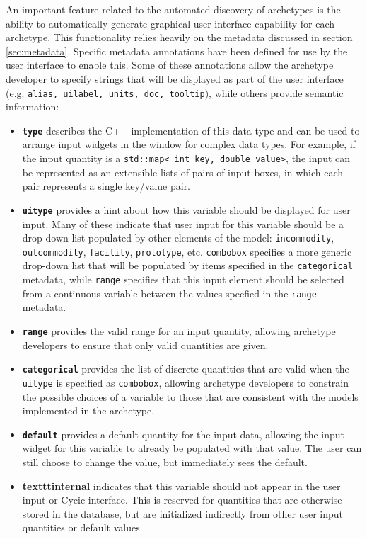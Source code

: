 An important feature related to the automated discovery of archetypes is the
ability to automatically generate graphical user interface capability for each
archetype.  This functionality relies heavily on the metadata discussed in
section \ref{sec:metadata}.  Specific metadata annotations have been defined
for use by the user interface to enable this.  Some of these annotations allow
the archetype developer to specify strings that will be displayed as part of
the user interface (e.g. \texttt{alias, uilabel, units, doc, tooltip}), while others
provide semantic information:
\begin{itemize}
\item \textbf{\texttt{type}} describes the C++ implementation of this data
  type and can be used to arrange input widgets in the window for complex data
  types.  For example, if the input quantity is a \texttt{std::map< int key,
    double value>}, the input can be represented as an extensible lists of pairs of
  input boxes, in which each pair represents a single key/value pair.
\item \textbf{\texttt{uitype}} provides a hint about how this variable should
  be displayed for user input.  Many of these indicate that user input for
  this variable should be a drop-down list populated by other elements of the
  model: \texttt{incommodity}, \texttt{outcommodity}, \texttt{facility},
  \texttt{prototype}, etc.  \texttt{combobox} specifies a more generic
  drop-down list that will be populated by items specified in the
  \texttt{categorical} metadata, while \texttt{range} specifies that this
  input element should be selected from a continuous variable between the
  values specfied in the \texttt{range} metadata.
\item \textbf{\texttt{range}} provides the valid range for an input quantity,
  allowing archetype developers to ensure that only valid quantities are
  given.
\item \textbf{\texttt{categorical}} provides the list of discrete quantities
  that are valid when the \texttt{uitype} is specified as \texttt{combobox},
  allowing archetype developers to constrain the possible choices of a
  variable to those that are consistent with the models implemented in the
  archetype.
\item \textbf{\texttt{default}} provides a default quantity for the input
  data, allowing the input widget for this variable to already be populated
  with that value.  The user can still choose to change the value, but
  immediately sees the default.
\item \textbf{texttt{internal}} indicates that this variable should not appear
  in the user input or Cycic interface.  This is reserved for quantities that
  are otherwise stored in the database, but are initialized indirectly from
  other user input quantities or default values.
\end{itemize}

